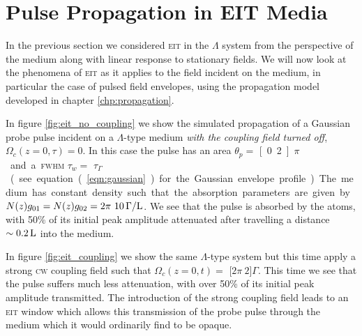 \section{Pulse Propagation in EIT Media}
  \label{sec:polaritons_propagation}

    In the previous section we considered \textsc{eit} in the $\Lambda$ system
    from the perspective of the medium along with linear response to stationary
    fields. We will now look at the phenomena of \textsc{eit} as it applies to
    the field incident on the medium, in particular the case of pulsed field
    envelopes, using the propagation model developed in chapter
    \ref{chp:propagation}.

    In figure \ref{fig:eit_no_coupling} we show the simulated propagation of a
    Gaussian probe pulse incident on a $\Lambda$-type medium \textit{with the
    coupling field turned off}, \ie $\Omega_c(z=0, \tau) = 0$. In this case the
    pulse has an area $\theta_p = $ \unit[0.2]{$\pi$} and a \textsc{fwhm}
    $\tau_w = $ \unit[1]{$\tau_\Gamma$} (see equation (\ref{eqn:gaussian}) for
    the Gaussian envelope profile). The medium has constant density such that
    the absorption parameters are given by  $N(z) g_{01} = N(z) g_{02} =
    \unit[2\pi~10]{\Gamma/L}$. We see that the pulse is absorbed by the atoms,
    with 50\% of its initial peak amplitude attenuated after travelling a
    distance $\unit[\sim0.2]{L}$ into the medium.

    In figure \ref{fig:eit_coupling} we show the same $\Lambda$-type system but
    this time apply a strong \textsc{cw} coupling field such that $\Omega_c(z =
    0, t) = $ \unit[$2\pi~2$]{$\Gamma$}. This time we see that the pulse suffers
    much less attenuation, with over 50\% of its initial peak amplitude
    transmitted. The introduction of the strong coupling field leads to an
    \textsc{eit} window which allows this transmission of the probe pulse
    through the medium which it would ordinarily find to be opaque.\cite{Fleischhauer2005}

